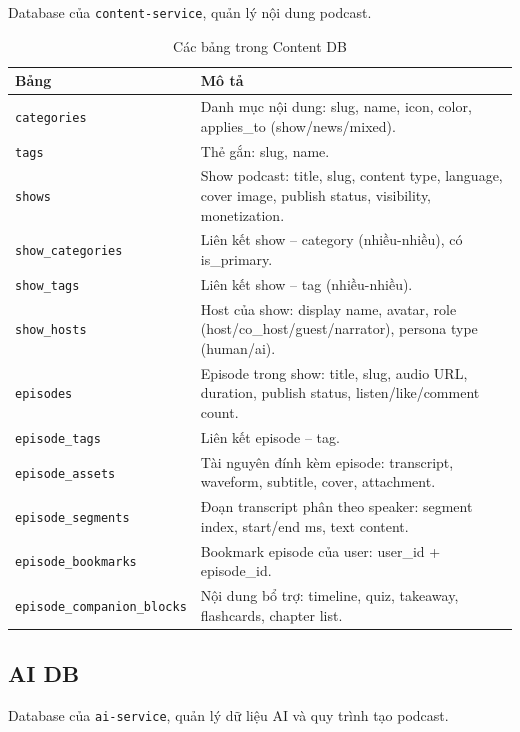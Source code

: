 \documentclass[14pt,a4paper,oneside]{extreport}
\begin{document}
Database của \texttt{content-service}, quản lý nội dung podcast.

\begin{table}[H]
\centering
\caption{Các bảng trong Content DB}
\label{tab:er-content}
\renewcommand{\arraystretch}{1.3}
\small
\begin{tabularx}{\textwidth}{|l|X|}
\hline
\textbf{Bảng} & \textbf{Mô tả} \\
\hline
\texttt{categories} & Danh mục nội dung: slug, name, icon, color, applies\_to (show/news/mixed). \\
\hline
\texttt{tags} & Thẻ gắn: slug, name. \\
\hline
\texttt{shows} & Show podcast: title, slug, content type, language, cover image, publish status, visibility, monetization. \\
\hline
\texttt{show\_categories} & Liên kết show -- category (nhiều-nhiều), có is\_primary. \\
\hline
\texttt{show\_tags} & Liên kết show -- tag (nhiều-nhiều). \\
\hline
\texttt{show\_hosts} & Host của show: display name, avatar, role (host/co\_host/guest/narrator), persona type (human/ai). \\
\hline
\texttt{episodes} & Episode trong show: title, slug, audio URL, duration, publish status, listen/like/comment count. \\
\hline
\texttt{episode\_tags} & Liên kết episode -- tag. \\
\hline
\texttt{episode\_assets} & Tài nguyên đính kèm episode: transcript, waveform, subtitle, cover, attachment. \\
\hline
\texttt{episode\_segments} & Đoạn transcript phân theo speaker: segment index, start/end ms, text content. \\
\hline
\texttt{episode\_bookmarks} & Bookmark episode của user: user\_id + episode\_id. \\
\hline
\texttt{episode\_companion\_blocks} & Nội dung bổ trợ: timeline, quiz, takeaway, flashcards, chapter list. \\
\hline
\end{tabularx}
\end{table}

\subsection{AI DB}

Database của \texttt{ai-service}, quản lý dữ liệu AI và quy trình tạo podcast.
\end{document}
